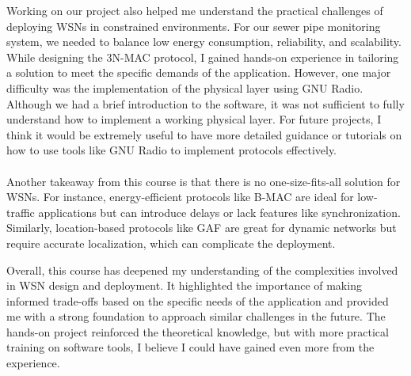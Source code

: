 Working on our project also helped me understand the practical challenges of deploying WSNs in constrained environments. For our sewer pipe monitoring system, we needed to balance low energy consumption, reliability, and scalability. While designing the 3N-MAC protocol, I gained hands-on experience in tailoring a solution to meet the specific demands of the application. However, one major difficulty was the implementation of the physical layer using GNU Radio. Although we had a brief introduction to the software, it was not sufficient to fully understand how to implement a working physical layer. For future projects, I think it would be extremely useful to have more detailed guidance or tutorials on how to use tools like GNU Radio to implement protocols effectively.
\\
\\
\indent Another takeaway from this course is that there is no one-size-fits-all solution for WSNs. For instance, energy-efficient protocols like B-MAC are ideal for low-traffic applications but can introduce delays or lack features like synchronization. Similarly, location-based protocols like GAF are great for dynamic networks but require accurate localization, which can complicate the deployment.

Overall, this course has deepened my understanding of the complexities involved in WSN design and deployment. It highlighted the importance of making informed trade-offs based on the specific needs of the application and provided me with a strong foundation to approach similar challenges in the future. The hands-on project reinforced the theoretical knowledge, but with more practical training on software tools, I believe I could have gained even more from the experience.